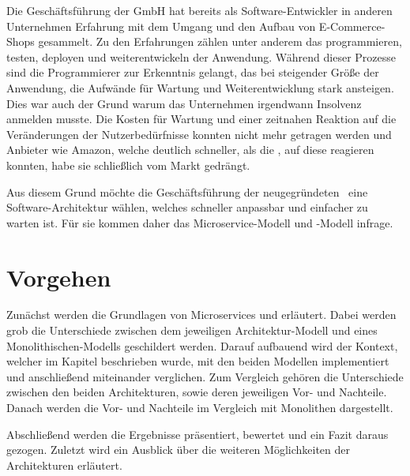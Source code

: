 Die Geschäftsführung der GmbH hat bereits als Software-Entwickler in anderen Unternehmen Erfahrung mit dem Umgang und den Aufbau von E-Commerce-Shops gesammelt. Zu den Erfahrungen zählen unter anderem das programmieren, testen, deployen und weiterentwickeln der Anwendung. Während dieser Prozesse sind die Programmierer zur Erkenntnis gelangt, das bei steigender Größe der Anwendung, die Aufwände für Wartung und Weiterentwicklung stark ansteigen. Dies war auch der Grund warum das Unternehmen irgendwann Insolvenz anmelden musste. Die Kosten für Wartung und einer zeitnahen Reaktion auf die Veränderungen der Nutzerbedürfnisse konnten nicht mehr getragen werden und Anbieter wie Amazon, welche deutlich schneller, als die \gmbh ,  auf diese reagieren konnten, habe sie schließlich vom Markt gedrängt.

Aus diesem Grund möchte die Geschäftsführung der neugegründeten \gmbh\ eine Software-Architektur wählen, welches schneller anpassbar und einfacher zu warten ist. Für sie kommen daher das Microservice-Modell und \SOA -Modell infrage.

\section{Vorgehen}
\label{sec:vorgehen}
Zunächst werden die Grundlagen von Microservices und \SOA erläutert. Dabei werden grob die Unterschiede zwischen dem jeweiligen Architektur-Modell und eines Monolithischen-Modells geschildert werden. Darauf aufbauend wird der Kontext, welcher im Kapitel  beschrieben wurde, mit den beiden Modellen implementiert und anschließend miteinander verglichen. Zum Vergleich gehören die Unterschiede zwischen den beiden Architekturen, sowie deren jeweiligen Vor- und Nachteile. Danach werden die Vor- und Nachteile im Vergleich mit Monolithen dargestellt.

Abschließend werden die Ergebnisse präsentiert, bewertet und ein Fazit daraus gezogen. Zuletzt wird ein Ausblick über die weiteren Möglichkeiten der Architekturen erläutert.